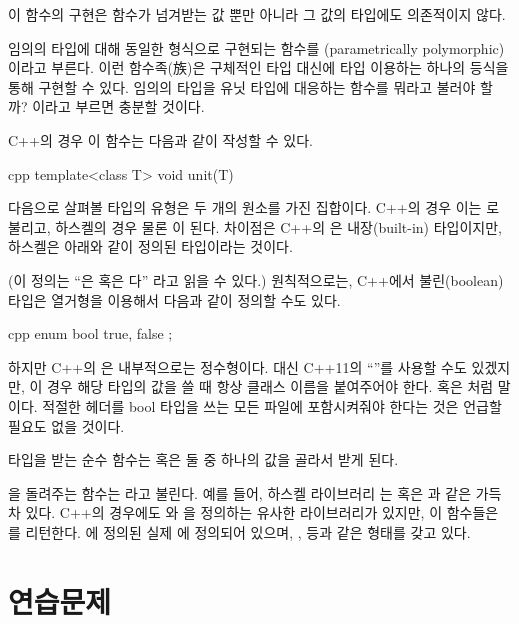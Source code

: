 이 함수의 구현은 함수가 넘겨받는 값 뿐만 아니라 그 값의 타입에도 의존적이지 않다.

임의의 타입에 대해 동일한 형식으로 구현되는 함수를 \trParameter\trPolymorphic(parametrically polymorphic)이라고 부른다.
이런 함수족(族)은 구체적인 타입 대신에 타입 \trParameter\를 이용하는 하나의 등식을 통해 구현할 수 있다.
임의의 타입을 유닛 타입에 대응하는 \trPolymorphic 함수를 뭐라고 불러야 할까?  이라고 부르면 충분할 것이다.


C++의 경우 이 함수는 다음과 같이 작성할 수 있다.

\begin{snip}{cpp}
template<class T>
void unit(T) {}
\end{snip}

다음으로 살펴볼 타입의 유형은 두 개의 원소를 가진 집합이다. C++의 경우 이는 로 불리고, 하스켈의 경우 물론 이 된다.
차이점은 C++의 은 내장(built-in) 타입이지만, 하스켈은 아래와 같이 정의된 타입이라는 것이다.

(이 정의는 ``은  혹은 다'' 라고 읽을 수 있다.)
원칙적으로는, C++에서 불린(boolean) 타입은 열거형을 이용해서 다음과 같이 정의할 수도 있다.

\begin{snip}{cpp}
enum bool { 
    true,
    false
};
\end{snip}
하지만 C++의 은 내부적으로는 정수형이다. 대신 C++11의 ``''를 사용할 수도 있겠지만, 이 경우 해당 타입의 값을 쓸 때 항상 클래스 이름을 붙여주어야 한다.
 혹은 처럼 말이다. 적절한 헤더를 bool 타입을 쓰는 모든 파일에 포함시켜줘야 한다는 것은 언급할 필요도 없을 것이다.

 타입을 받는 순수 함수는  혹은  둘 중 하나의 값을 골라서 받게 된다.

을 돌려주는 함수는 라고 불린다.
예를 들어, 하스켈 라이브러리 는  혹은 과 같은 \trPredicates\로 가득 차 있다.
C++의 경우에도 와 을 정의하는 유사한 라이브러리가 있지만, 이 함수들은 를 리턴한다.
에 정의된 실제 \trPredicates\는 에 정의되어 있으며, ,  등과 같은 형태를 갖고 있다.

\section{연습문제}

